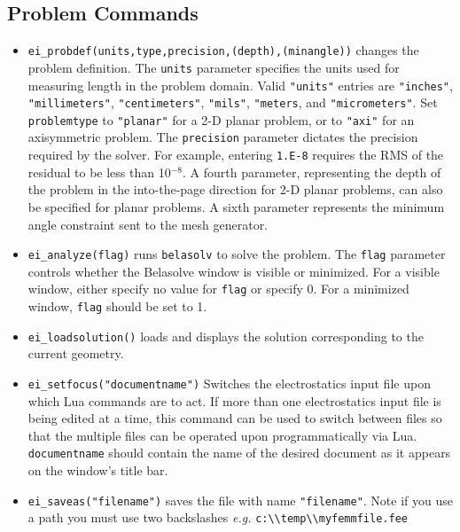 \subsection{Problem Commands}

\begin{itemize}
\item {\tt ei\_probdef(units,type,precision,(depth),(minangle))} changes the problem
definition. The \texttt{units} parameter specifies the units used
for measuring length in the problem domain. Valid \texttt{"units"}
entries are
\texttt{"inches"}, \texttt{"millimeters"}, \texttt{"centimeters"},
\texttt{"mils"}, \texttt{"meters}, and \texttt{"micrometers"}. Set
\texttt{problemtype} to \texttt{"planar"} for a 2-D planar problem, or to
\texttt{"axi"} for an axisymmetric problem. The \texttt{precision} parameter
dictates the precision required by the solver. For example, entering
\texttt{1.E-8} requires the RMS of the residual to be less than 10$^{ - 8}$.
A fourth parameter, representing the depth of the problem in the
into-the-page direction for 2-D planar problems, can also be specified
for planar problems. A sixth parameter represents the minimum angle constraint sent to the mesh generator.

\item {\tt ei\_analyze(flag)} runs \texttt{belasolv} to solve the problem. The
\texttt{flag} parameter controls whether the Belasolve window is visible or
minimized. For a visible window, either specify no value for
\texttt{flag} or specify 0. For a minimized window, \texttt{flag}
should be set to 1.

\item {\tt ei\_loadsolution()} loads and displays the solution corresponding to the
current geometry.

\item {\tt ei\_setfocus("documentname")} Switches the
electrostatics input file upon which Lua commands are to act. If
more than one electrostatics input file is being edited at a time,
this command can be used to switch between files so that the
multiple files can be operated upon programmatically via Lua. {\tt
documentname} should contain the name of the desired document as
it appears on the window's title bar.

\item {\tt ei\_saveas("filename")} saves the file with name
\texttt{"filename"}. Note if you use a path you must use two backslashes
{\em e.g.} \verb+c:\\temp\\myfemmfile.fee+

\end{itemize}

